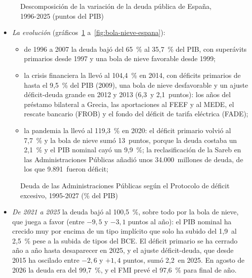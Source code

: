 \documentclass[11pt]{article}
\begin{document}
\begin{figure}[H]
\centering
\caption{Descomposición de la variación de la deuda pública de España, 1996-2025 (puntos del PIB)}\label{fig:descomposicion-deuda}
\end{figure}

\begin{itemize}
\item \emph{La evolución} (gráficos~\ref{fig:descomposicion-deuda} a~\ref{fig:bola-nieve-espana}):
  \begin{itemize}
  \item de 1996 a 2007 la deuda bajó del 65~\% al 35,7~\% del PIB, con superávits primarios desde 1997 y una bola de nieve favorable desde 1999;
  \item la crisis financiera la llevó al 104,4~\% en 2014, con déficits primarios de hasta el 9,5~\% del PIB (2009), una bola de nieve desfavorable y un ajuste déficit-deuda grande en 2012 y 2013 (6,3~y 2,1~puntos)\nocite{Eurostat2026EDP}: los años del préstamo bilateral a Grecia, las aportaciones al FEEF y al MEDE, el rescate bancario (FROB) y el fondo del déficit de tarifa eléctrica (FADE)\nocite{EstevePrats2023Cambios};
  \item la pandemia la llevó al 119,3~\% en 2020: el déficit primario volvió al 7,7~\% y la bola de nieve sumó 13~puntos, porque la deuda costaba un 2,1~\% y el PIB nominal cayó un 9,9~\%; la reclasificación de la Sareb en las Administraciones Públicas añadió unos 34.000~millones de deuda, de los que 9.891~fueron déficit\nocite{Eurostat2026EDP,Hacienda2021Cierre2020};
  \end{itemize}
\end{itemize}

\begin{figure}[H]
\centering
\caption{Deuda de las Administraciones Públicas según el Protocolo de déficit excesivo, 1995-2027 (\% del PIB)}\label{fig:deuda-espana}
\end{figure}

\begin{itemize}
\item \emph{De 2021 a 2025} la deuda bajó al 100,5~\%, sobre todo por la bola de nieve, que juega a favor (entre $-9{,}5$ y $-3{,}1$ puntos al año): el PIB nominal ha crecido muy por encima de un tipo implícito que solo ha subido del 1,9~al 2,5~\% pese a la subida de tipos del BCE. El déficit primario se ha cerrado año a año hasta desaparecer en 2025, y el ajuste déficit-deuda, que desde 2015 ha oscilado entre $-2{,}6$ y $+1{,}4$ puntos, sumó 2,2~en 2025\nocite{Eurostat2026EDP}. En agosto de 2026 la deuda era del 99,7~\%\nocite{BdE2026DeudaAgosto}, y el FMI prevé el 97,6~\% para final de año\nocite{FMI2026WEO}.
\end{itemize}
\end{document}
